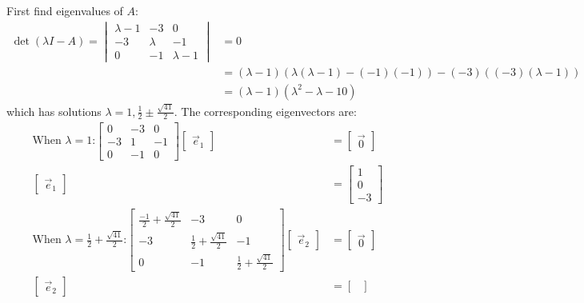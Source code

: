 \documentclass[11pt]{homework}
\begin{document}
First find eigenvalues of $A$:
\begin{align*}
\det (\lambda I - A) = 
  \begin{vmatrix}
  \lambda - 1 & -3 & 0 \\
  -3 & \lambda & -1 \\
  0 & -1 & \lambda-1
  \end{vmatrix}
  &= 0 \\
  &= (\lambda-1) (\lambda( \lambda -1) - (-1)(-1)) -(-3) ((-3)(\lambda - 1)) \\
  &= (\lambda-1) (\lambda^2 - \lambda - 10) 
\end{align*}
which has solutions $\lambda = 1, \frac{1}{2} \pm \frac{\sqrt{41}}{2}$.
The corresponding eigenvectors are:
\begin{align*}
  \text{When $\lambda = 1$:}
  \begin{bmatrix}
  0 & -3 & 0 \\
  -3 & 1 & -1 \\
  0 & -1 & 0
  \end{bmatrix}
  \begin{bmatrix}
    \vec e_1
  \end{bmatrix}
  &= 
  \begin{bmatrix}
    \vec 0
  \end{bmatrix} \\
  \begin{bmatrix}
    \vec e_1
  \end{bmatrix}
  &= 
  \begin{bmatrix}
  1 \\
  0 \\
  -3
  \end{bmatrix} \\
  \text{When $\lambda = \frac{1}{2} + \frac{\sqrt{41}}{2}$:}
  \begin{bmatrix}
  \frac{-1}{2} + \frac{\sqrt{41}}{2} & -3 & 0 \\
  -3 & \frac{1}{2} + \frac{\sqrt{41}}{2} & -1 \\
  0 & -1 & \frac{1}{2} + \frac{\sqrt{41}}{2}
  \end{bmatrix}
  \begin{bmatrix}
    \vec e_2
  \end{bmatrix}
  &= 
  \begin{bmatrix}
    \vec 0
  \end{bmatrix} \\
  \begin{bmatrix}
    \vec e_2
  \end{bmatrix}
  &= 
  \begin{bmatrix}

\end{bmatrix}
\end{align*}
\end{document}
